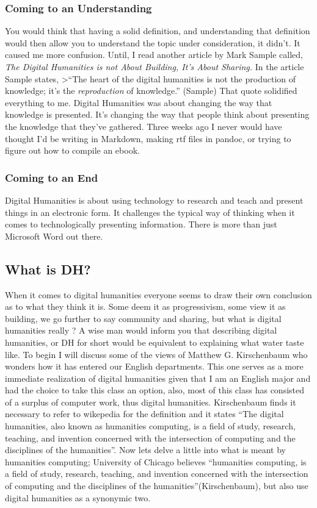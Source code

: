 \documentclass[]{article}
\begin{document}
\subsubsection{Coming to an
Understanding}\label{coming-to-an-understanding}

You would think that having a solid definition, and understanding that
definition would then allow you to understand the topic under
consideration, it didn't. It caused me more confusion. Until, I read
another article by Mark Sample called, \emph{The Digital Humanities is
not About Building, It's About Sharing.} In the article Sample states,
\textgreater{}``The heart of the digital humanities is not the
production of knowledge; it's the \emph{reproduction} of knowledge.''
(Sample) That quote solidified everything to me. Digital Humanities was
about changing the way that knowledge is presented. It's changing the
way that people think about presenting the knowledge that they've
gathered. Three weeks ago I never would have thought I'd be writing in
Markdown, making rtf files in pandoc, or trying to figure out how to
compile an ebook.

\subsubsection{Coming to an End}\label{coming-to-an-end}

Digital Humanities is about using technology to research and teach and
present things in an electronic form. It challenges the typical way of
thinking when it comes to technologically presenting information. There
is more than just Microsoft Word out there.

\subsection{What is DH?}\label{what-is-dh-1}

When it comes to digital humanities everyone seems to draw their own
conclusion as to what they think it is. Some deem it as progressivism,
some view it as building, we go further to say community and sharing,
but what is digital humanities really ? A wise man would inform you that
describing digital humanities, or DH for short would be equivalent to
explaining what water taste like. To begin I will discuss some of the
views of Matthew G. Kirschenbaum who wonders how it has entered our
English departments. This one serves as a more immediate realization of
digital humanities given that I am an English major and had the choice
to take this class an option, also, most of this class has consisted of
a surplus of computer work, thus digital humanities. Kirschenbaum finds
it necessary to refer to wikepedia for the definition and it states
``The digital humanities, also known as humanities computing, is a field
of study, research, teaching, and invention concerned with the
intersection of computing and the disciplines of the humanities''. Now
lets delve a little into what is meant by humanities computing;
University of Chicago believes ``humanities computing, is a field of
study, research, teaching, and invention concerned with the intersection
of computing and the disciplines of the humanities''(Kirschenbaum), but
also use digital humanities as a synonymic two.
\end{document}
